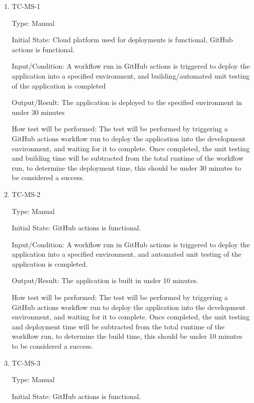 \documentclass[12pt, titlepage]{article}
\begin{document}
\begin{enumerate}

  \item{TC-MS-1\\}

    Type: Manual

    Initial State: Cloud platform used for deployments is functional,
    GitHub actions is functional.

    Input/Condition: A workflow run in GitHub actions is triggered to
    deploy the application into a specified environment, and
    building/automated unit testing of the application is completed

    Output/Result: The application is deployed to the specified
    environment in under 30 minutes

    How test will be performed: The test will be performed by
    triggering a GitHub actions workflow run to deploy the application
    into the development environment, and waiting for it to complete.
    Once completed, the unit testing and building time will be subtracted
    from the total runtime of the workflow run, to determine the
    deployment time, this should be under 30 minutes to be considered a success.

  \item{TC-MS-2\\}

    Type: Manual

    Initial State: GitHub actions is functional.

    Input/Condition: A workflow run in GitHub actions is triggered to
    deploy the application into a specified environment, and
    automated unit testing of the application is completed.

    Output/Result: The application is built in under 10 minutes.

    How test will be performed: The test will be performed by
    triggering a GitHub actions workflow run to deploy the application
    into the development environment, and waiting for it to complete.
    Once completed, the unit testing and deployment time will be subtracted
    from the total runtime of the workflow run, to determine the
    build time, this should be under 10 minutes to be considered a success.

  \item{TC-MS-3\\}

    Type: Manual

    Initial State: GitHub actions is functional.


\end{enumerate}
\end{document}
